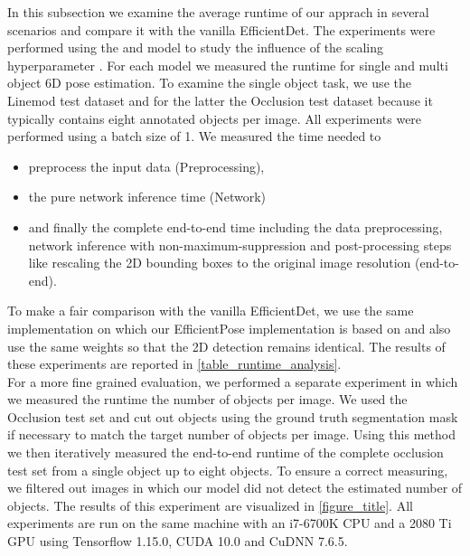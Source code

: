 \documentclass[twocolumn, 10pt, letterpaper]{article}
\begin{document}
In this subsection we examine the average runtime of our apprach in several scenarios and compare it with the vanilla EfficientDet\cite{EfficientDet}. The experiments were performed using the  and  model to study the influence of the scaling hyperparameter . For each model we measured the runtime for single and multi object 6D pose estimation. To examine the single object task, we use the Linemod test dataset and for the latter the Occlusion test dataset because it typically contains eight annotated objects per image. All experiments were performed using a batch size of 1. We measured the time needed to
\begin{itemize}
\item preprocess the input data (Preprocessing),
\item the pure network inference time (Network)
\item and finally the complete end-to-end time including the data preprocessing, network inference with non-maximum-suppression and post-processing steps like rescaling the 2D bounding boxes to the original image resolution (end-to-end).
\end{itemize}
 To make a fair comparison with the vanilla EfficientDet, we use the same implementation on which our EfficientPose implementation is based on and also use the same weights so that the 2D detection remains identical. The results of these experiments are reported in \autoref{table_runtime_analysis}.\\
For a more fine grained evaluation, we performed a separate experiment in which we measured the runtime \wrt the number of objects per image. We used the Occlusion test set and cut out objects using the ground truth segmentation mask if necessary to match the target number of objects per image. Using this method we then iteratively measured the end-to-end runtime of the complete occlusion test set from a single object up to eight objects. To ensure a correct measuring, we filtered out images in which our model did not detect the estimated number of objects. The results of this experiment are visualized in \autoref{figure_title}. All experiments are run on the same machine with an i7-6700K CPU and a 2080 Ti GPU using Tensorflow 1.15.0, CUDA 10.0 and CuDNN 7.6.5.\\
\end{document}
